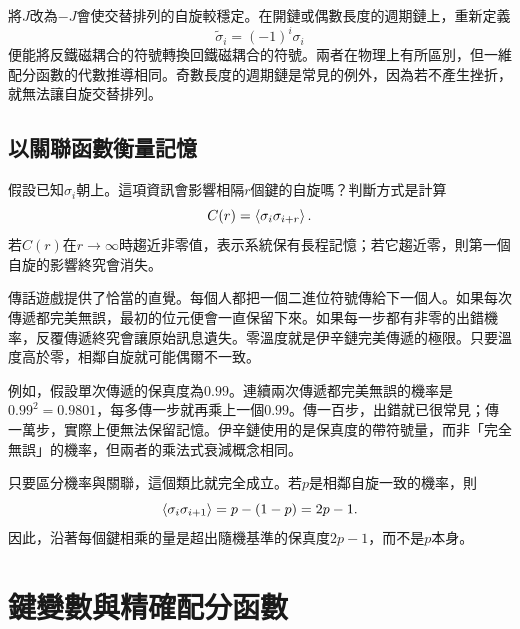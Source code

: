 將\(J\)改為\(-J\)會使交替排列的自旋較穩定。在開鏈或偶數長度的週期鏈上，重新定義
\begin{equation}
\widetilde{\sigma}_i=(-1)^i\sigma_i
\end{equation}
便能將反鐵磁耦合的符號轉換回鐵磁耦合的符號。兩者在物理上有所區別，但一維配分函數的代數推導相同。奇數長度的週期鏈是常見的例外，因為若不產生挫折，就無法讓自旋交替排列。

\begin{classroomqa}
\end{classroomqa}

\subsection{以關聯函數衡量記憶}

假設已知\(\sigma_i\)朝上。這項資訊會影響相隔\(r\)個鍵的自旋嗎？判斷方式是計算
\begin{equation}
C(r)=\left\langle\sigma_i\sigma_{i+r}\right\rangle.
\end{equation}
若\(C(r)\)在\(r\to\infty\)時趨近非零值，表示系統保有長程記憶；若它趨近零，則第一個自旋的影響終究會消失。

傳話遊戲提供了恰當的直覺。每個人都把一個二進位符號傳給下一個人。如果每次傳遞都完美無誤，最初的位元便會一直保留下來。如果每一步都有非零的出錯機率，反覆傳遞終究會讓原始訊息遺失。零溫度就是伊辛鏈完美傳遞的極限。只要溫度高於零，相鄰自旋就可能偶爾不一致。

例如，假設單次傳遞的保真度為\(0.99\)。連續兩次傳遞都完美無誤的機率是\(0.99^2=0.9801\)，每多傳一步就再乘上一個\(0.99\)。傳一百步，出錯就已很常見；傳一萬步，實際上便無法保留記憶。伊辛鏈使用的是保真度的帶符號量，而非「完全無誤」的機率，但兩者的乘法式衰減概念相同。

只要區分機率與關聯，這個類比就完全成立。若\(p\)是相鄰自旋一致的機率，則
\begin{equation}
\left\langle\sigma_i\sigma_{i+1}\right\rangle
=p-(1-p)=2p-1.
\end{equation}
因此，沿著每個鍵相乘的量是超出隨機基準的保真度\(2p-1\)，而不是\(p\)本身。

\section{鍵變數與精確配分函數}

